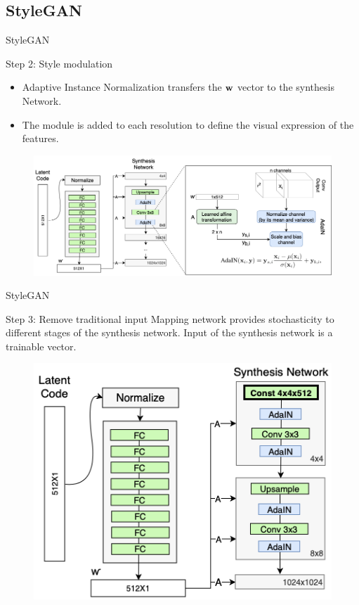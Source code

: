 \subsection{StyleGAN}
\begin{frame}{StyleGAN}
	\begin{block}{Step 2: Style modulation}
		\begin{itemize}
			\item Adaptive Instance Normalization transfers the $\mathbf{w}$ vector to the synthesis Network.
			\item The module is added to each resolution to define the visual expression of the features.
		\end{itemize}
		\begin{figure}
			\centering
			\includegraphics[width=1.0\linewidth]{figs/stylegan_adain}
		\end{figure}
	\end{block}

\end{frame}
\begin{frame}{StyleGAN}
	\begin{block}{Step 3: Remove traditional input}
		Mapping network provides stochasticity to different stages of the synthesis network. Input of the synthesis network is a trainable vector.
		\begin{figure}
			\centering
			\includegraphics[width=0.55\linewidth]{figs/stylegan_input}
		\end{figure}
	\end{block}

\end{frame}
